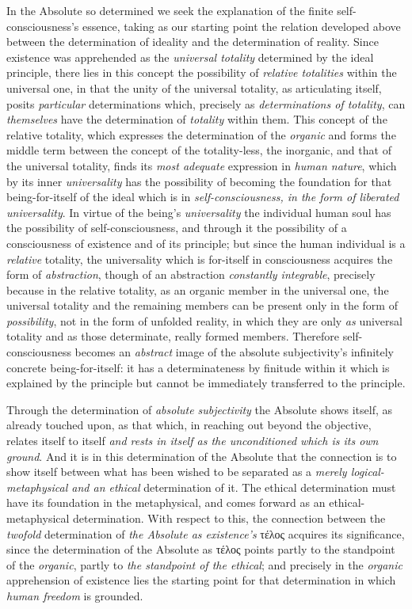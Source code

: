 \documentclass[12pt,a4paper]{book}
\begin{document}
In the Absolute so determined we seek the explanation of the finite
self-consciousness's essence, taking as our starting point the relation
developed above between the determination of ideality and the determination of
reality. Since existence was apprehended as the \emph{universal totality}
determined by the ideal principle, there lies in this concept the possibility
of \emph{relative totalities} within the universal one, in that the unity of
the universal totality, as articulating itself, posits \emph{particular}
determinations which, precisely as \emph{determinations of totality}, can
\emph{themselves} have the determination of \emph{totality} within them. This
concept of the relative totality, which expresses the determination of the
\emph{organic} and forms the middle term between the concept of the
totality-less, the inorganic, and that of the universal totality, finds its
\emph{most adequate} expression in \emph{human nature}, which by its inner
\emph{universality} has the possibility of becoming the foundation for that
being-for-itself of the ideal which is in \emph{self-consciousness, in the
form of liberated universality}. In virtue of the being's \emph{universality}
the individual human soul has the possibility of self-consciousness, and
through it the possibility of a consciousness of existence and of its
principle; but since the human individual is a \emph{relative} totality, the
universality which is for-itself in consciousness acquires the form of
\emph{abstraction}, though of an abstraction \emph{constantly integrable},
precisely because in the relative totality, as an organic member in the
universal one, the universal totality and the remaining members can be present
only in the form of \emph{possibility}, not in the form of unfolded reality,
in which they are only \emph{as} universal totality and as those determinate,
really formed members. Therefore self-consciousness becomes an
\emph{abstract} image of the absolute subjectivity's infinitely concrete
being-for-itself: it has a determinateness by finitude within it which is
explained by the principle but cannot be immediately transferred to the
principle.

Through the determination of \emph{absolute subjectivity} the Absolute shows
itself, as already touched upon, as that which, in reaching out beyond the
objective, relates itself to itself \emph{and rests in itself as the
unconditioned which is its own ground}. And it is in this determination of the
Absolute that the connection is to show itself between what has been wished to
be separated as a \emph{merely logical-metaphysical and an ethical}
determination of it. The ethical determination must have its foundation in the
metaphysical, and comes forward as an ethical-metaphysical determination. With
respect to this, the connection between the \emph{twofold} determination of
\emph{the Absolute as existence's} τέλος acquires its significance, since the
determination of the Absolute as τέλος points partly to the standpoint of the
\emph{organic}, partly to \emph{the standpoint of the ethical}; and precisely
in the \emph{organic} apprehension of existence lies the starting point for
that determination in which \emph{human freedom} is grounded.
\end{document}
